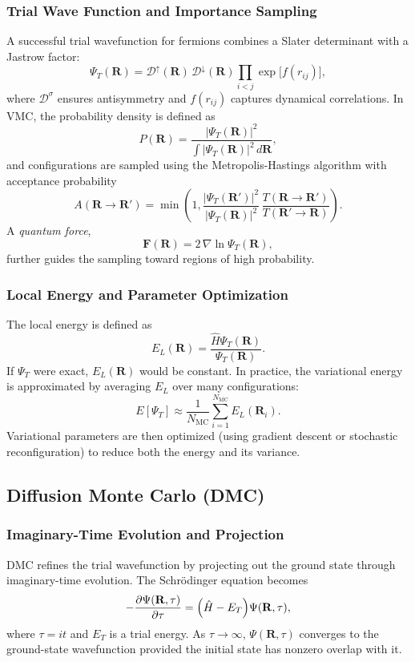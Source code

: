 \subsubsection{Trial Wave Function and Importance Sampling}
A successful trial wavefunction for fermions combines a Slater determinant with a Jastrow factor:
\[
\Psi_T(\mathbf{R}) = \mathcal{D}^\uparrow(\mathbf{R})\, \mathcal{D}^\downarrow(\mathbf{R}) \prod_{i<j} \exp\!\bigl[f(r_{ij})\bigr],
\]
where $\mathcal{D}^\sigma$ ensures antisymmetry and $f(r_{ij})$ captures dynamical correlations. In VMC, the probability density is defined as
\[
P(\mathbf{R}) = \frac{|\Psi_T(\mathbf{R})|^2}{\int |\Psi_T(\mathbf{R})|^2\, d\mathbf{R}},
\]
and configurations are sampled using the Metropolis-Hastings algorithm with acceptance probability
\[
A(\mathbf{R} \to \mathbf{R}') = \min\!\left(1, \frac{|\Psi_T(\mathbf{R}')|^2}{|\Psi_T(\mathbf{R})|^2}\, \frac{T(\mathbf{R} \to \mathbf{R}')}{T(\mathbf{R}' \to \mathbf{R})}\right).
\]
A \emph{quantum force},
\[
\mathbf{F}(\mathbf{R}) = 2\, \nabla \ln \Psi_T(\mathbf{R}),
\]
further guides the sampling toward regions of high probability.

\subsubsection{Local Energy and Parameter Optimization}
The local energy is defined as
\[
E_L(\mathbf{R}) = \frac{\hat{H}\Psi_T(\mathbf{R})}{\Psi_T(\mathbf{R})}.
\]
If $\Psi_T$ were exact, $E_L(\mathbf{R})$ would be constant. In practice, the variational energy is approximated by averaging $E_L$ over many configurations:
\[
E[\Psi_T] \approx \frac{1}{N_{\text{MC}}} \sum_{i=1}^{N_{\text{MC}}} E_L(\mathbf{R}_i).
\]
Variational parameters are then optimized (using gradient descent or stochastic reconfiguration) to reduce both the energy and its variance.

\subsection{Diffusion Monte Carlo (DMC)}
\subsubsection{Imaginary-Time Evolution and Projection}
DMC refines the trial wavefunction by projecting out the ground state through imaginary-time evolution. The Schrödinger equation becomes
\[
-\frac{\partial \Psi(\mathbf{R}, \tau)}{\partial \tau} = \Bigl(\hat{H} - E_T\Bigr)\Psi(\mathbf{R}, \tau),
\]
where $\tau = it$ and $E_T$ is a trial energy. As $\tau \to \infty$, $\Psi(\mathbf{R}, \tau)$ converges to the ground-state wavefunction provided the initial state has nonzero overlap with it.

